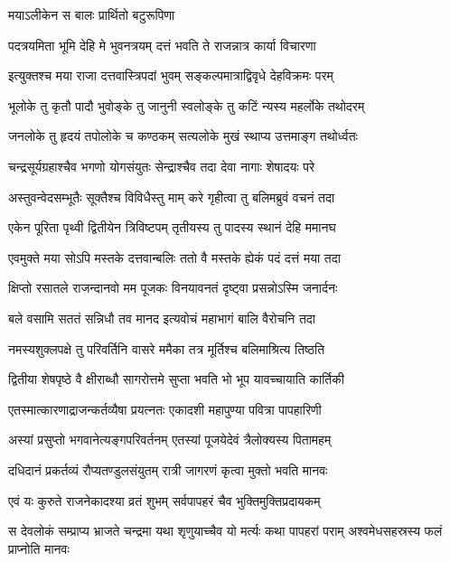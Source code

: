 

\onelineshloka
{मयाऽलीकेन स बालः प्रार्थितो बटुरूपिणा} %

\twolineshloka
{पदत्रयमिता भूमि देहि मे भुवनत्रयम्}
{दत्तं भवति ते राजन्नात्र कार्या विचारणा} %

\twolineshloka
{इत्युक्तश्च मया राजा दत्तवास्त्रिपदां भुवम्}
{सङ्कल्पमात्राद्विवृधे देहविक्रमः परम्} %

\twolineshloka
{भूलोके तु कृतौ पादौ भुवोङ्के तु जानुनी}
{स्वलोङ्के तु कटिं न्यस्य महर्लोके तथोदरम्} %

\twolineshloka
{जनलोके तु हृदयं तपोलोके च कण्ठकम्}
{सत्यलोके मुखं स्थाप्य उत्तमाङ्ग तथोर्ध्वतः} %

\twolineshloka
{चन्द्रसूर्यग्रहाश्चैव भगणो योगसंयुतः}
{सेन्द्राश्चैव तदा देवा नागाः शेषादयः परे} %

\twolineshloka
{अस्तुवन्वेदसम्भूतैः सूक्तैश्च विविधैस्तु माम्}
{करे गृहीत्वा तु बलिमब्रुवं वचनं तदा} %

\twolineshloka
{एकेन पूरिता पृथ्वी द्वितीयेन त्रिविष्टपम्}
{तृतीयस्य तु पादस्य स्थानं देहि ममानघ} %

\twolineshloka
{एवमुक्ते मया सोऽपि मस्तके दत्तवान्बलिः}
{ततो वै मस्तके ह्येकं पदं दत्तं मया तदा} %

\twolineshloka
{क्षिप्तो रसातले राजन्दानवो मम पूजकः}
{विनयावनतं दृष्ट्वा प्रसन्नोऽस्मि जनार्दनः} %

\twolineshloka
{बले वसामि सततं सन्निधौ तव मानद}
{इत्यवोचं महाभागं बालि वैरोचनि तदा} %

\twolineshloka
{नमस्यशुक्लपक्षे तु परिवर्तिनि वासरे}
{ममैका तत्र मूर्तिश्च बलिमाश्रित्य तिष्ठति} %

\twolineshloka
{द्वितीया शेषपृष्ठे वै क्षीराब्धौ सागरोत्तमे}
{सुप्ता भवति भो भूप यावच्चायाति कार्तिकी} %

\twolineshloka
{एतस्मात्कारणाद्राजन्कर्तव्यैषा प्रयत्नतः}
{एकादशी महापुण्या पवित्रा पापहारिणी} %

\twolineshloka
{अस्यां प्रसुप्तो भगवानेत्यङ्गपरिवर्तनम्}
{एतस्यां पूजयेदेवं त्रैलोक्यस्य पितामहम्} %

\twolineshloka
{दधिदानं प्रकर्तव्यं रौप्यतण्डुलसंयुतम्}
{रात्री जागरणं कृत्वा मुक्तो भवति मानवः} %

\twolineshloka
{एवं यः कुरुते राजनेकादश्या व्रतं शुभम्}
{सर्वपापहरं चैव भुक्तिमुक्तिप्रदायकम्} %

\threelineshloka
{स देवलोकं सम्प्राप्य भ्राजते चन्द्रमा यथा}
{शृणुयाच्चैव यो मर्त्यः कथा पापहरां पराम्}
{अश्वमेधसहस्रस्य फलं प्राप्नोति मानवः} %

